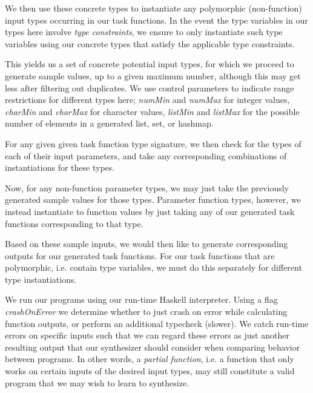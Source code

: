 \documentclass{article}
\begin{document}
We then use these concrete types to instantiate any polymorphic
(non-function) input types occurring in our task functions.
In the event the type variables in our types here involve \emph{type constraints},
we ensure to only instantiate such type variables using our concrete types that satisfy the applicable type constraints.

This yields us a set of concrete potential input types,
for which we proceed to generate sample values,
up to a given maximum number,
although this may get less after filtering out duplicates.
We use control parameters to indicate range restrictions for different types here;
\emph{numMin} and \emph{numMax} for integer values,
\emph{charMin} and \emph{charMax} for character values,
\emph{listMin} and \emph{listMax} for the possible number of elements in a generated list, set, or hashmap.

For any given given task function type signature,
we then check for the types of each of their input parameters,
and take any corresponding combinations of instantiations for these types.

Now, for any non-function parameter types,
we may just take the previously generated sample values for those types.
Parameter function types, however,
we instead instantiate to function values by just taking
any of our generated task functions corresponding to that type.

Based on these sample inputs, we would then like to generate corresponding outputs for our generated task functions.
For our task functions that are polymorphic, i.e. contain type variables,
we must do this separately for different type instantiations.


We run our programs using our run-time Haskell interpreter.
Using a flag \emph{crashOnError} we determine whether to
just crash on error while calculating function outputs,
or perform an additional typecheck (slower).
We catch run-time errors on specific inputs such that
we can regard these errors as just another resulting output
that our synthesizer should consider when comparing behavior between programs.
In other words, a \emph{partial function},
i.e. a function that only works on certain inputs of the desired input types,
may still constitute a valid program that we may wish to learn to synthesize.
\end{document}
